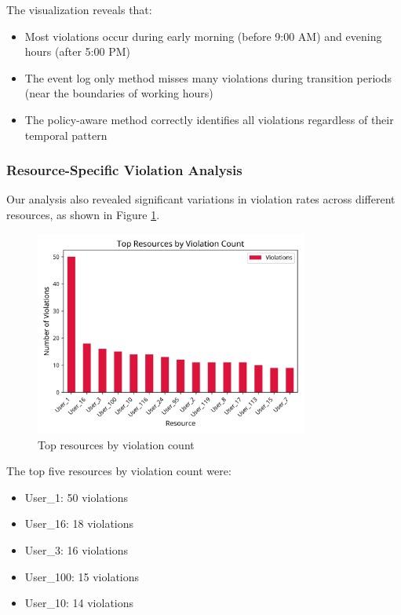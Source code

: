 The visualization reveals that:

\begin{itemize}
    \item Most violations occur during early morning (before 9:00 AM) and evening hours (after 5:00 PM)
    \item The event log only method misses many violations during transition periods (near the boundaries of working hours)
    \item The policy-aware method correctly identifies all violations regardless of their temporal pattern
\end{itemize}

\subsubsection{Resource-Specific Violation Analysis}

Our analysis also revealed significant variations in violation rates across different resources, as shown in Figure \ref{fig:resource-violations}.

\begin{figure}[h]
\centering
\includegraphics[width=0.8\textwidth]{results/violations_by_resource.png}
\caption{Top resources by violation count}
\label{fig:resource-violations}
\end{figure}

The top five resources by violation count were:
\begin{itemize}
    \item User\_1: 50 violations
    \item User\_16: 18 violations
    \item User\_3: 16 violations
    \item User\_100: 15 violations
    \item User\_10: 14 violations
\end{itemize}

